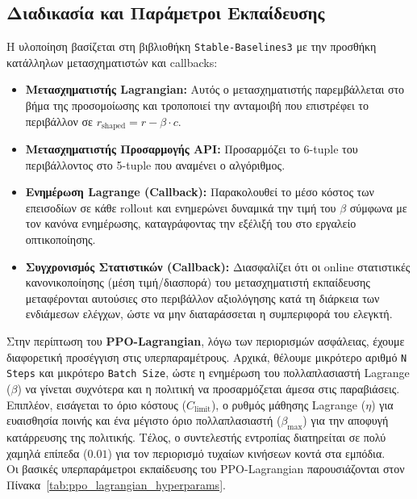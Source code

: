 \documentclass[acmsmall,screen,nonacm]{acmart}
\begin{document}
	\subsection{Διαδικασία και Παράμετροι Εκπαίδευσης}
	Η υλοποίηση βασίζεται στη βιβλιοθήκη \texttt{Stable-Baselines3} με την προσθήκη κατάλληλων μετασχηματιστών και callbacks:
	\begin{itemize}
		\item \textbf{Μετασχηματιστής Lagrangian:} Αυτός ο μετασχηματιστής παρεμβάλλεται στο βήμα της προσομοίωσης και τροποποιεί την ανταμοιβή που επιστρέφει το περιβάλλον σε $r_{\text{shaped}} = r - \beta \cdot c$.
		\item \textbf{Μετασχηματιστής Προσαρμογής API:} Προσαρμόζει το 6-tuple του περιβάλλοντος στο 5-tuple που αναμένει ο αλγόριθμος.
		\item \textbf{Ενημέρωση Lagrange (Callback):} Παρακολουθεί το μέσο κόστος των επεισοδίων σε κάθε rollout και ενημερώνει δυναμικά την τιμή του $\beta$ σύμφωνα με τον κανόνα ενημέρωσης, καταγράφοντας την εξέλιξή του στο εργαλείο οπτικοποίησης.
		\item \textbf{Συγχρονισμός Στατιστικών (Callback):} Διασφαλίζει ότι οι online στατιστικές κανονικοποίησης (μέση τιμή/διασπορά) του μετασχηματιστή εκπαίδευσης μεταφέρονται αυτούσιες στο περιβάλλον αξιολόγησης κατά τη διάρκεια των ενδιάμεσων ελέγχων, ώστε να μην διαταράσσεται η συμπεριφορά του ελεγκτή.
	\end{itemize}
	
	Στην περίπτωση του \textbf{PPO-Lagrangian}, λόγω των περιορισμών ασφάλειας, έχουμε διαφορετική προσέγγιση στις υπερπαραμέτρους. Αρχικά, θέλουμε μικρότερο αριθμό \texttt{N Steps} και μικρότερο \texttt{Batch Size}, ώστε η ενημέρωση του πολλαπλασιαστή Lagrange ($\beta$) να γίνεται συχνότερα και η πολιτική να προσαρμόζεται άμεσα στις παραβιάσεις. Επιπλέον, εισάγεται το όριο κόστους ($C_{\text{limit}}$), ο ρυθμός μάθησης Lagrange ($\eta$) για ευαισθησία ποινής και ένα μέγιστο όριο πολλαπλασιαστή ($\beta_{\text{max}}$) για την αποφυγή κατάρρευσης της πολιτικής. Τέλος, ο συντελεστής εντροπίας διατηρείται σε πολύ χαμηλά επίπεδα ($0.01$) για τον περιορισμό τυχαίων κινήσεων κοντά στα εμπόδια.\\

	Οι βασικές υπερπαράμετροι εκπαίδευσης του PPO-Lagrangian παρουσιάζονται στον Πίνακα~\ref{tab:ppo_lagrangian_hyperparams}.
\end{document}
